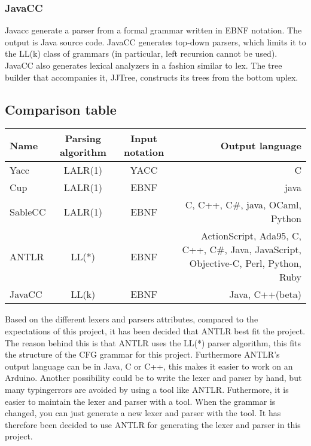 \subsubsection{JavaCC}
Javacc generate a parser from a formal grammar written in EBNF notation. The output is Java source code. JavaCC generates top-down parsers, which limits it to the LL(k) class of grammars (in particular, left recursion cannot be used). JavaCC also generates lexical analyzers in a fashion similar to lex\citep{Javacc}. The tree builder that accompanies it, JJTree, constructs its trees from the bottom uplex\citep{JJTree}.


\subsection{Comparison table}
\begin{table}[H]
\begin{tabularx}{\textwidth}{|l|c|c|R|}
\hline
\textbf{Name} & \textbf{Parsing algorithm} & \textbf{Input notation} & \textbf{Output language}\\ \hline
Yacc & LALR(1) & YACC & C\\ \hline
Cup & LALR(1) & EBNF & java\\ \hline
SableCC & LALR(1) & EBNF & C, C++, C\#, java, OCaml, Python\\ \hline
ANTLR & LL(*) & EBNF & ActionScript, Ada95, C, C++, C\#, Java, JavaScript, Objective-C, Perl, Python, Ruby\\ \hline
JavaCC & LL(k) & EBNF & Java, C++(beta)\\ \hline
\end{tabularx}
\end{table}

Based on the different lexers and parsers attributes, compared to the expectations of this project, it has been decided that ANTLR best fit the project. The reason behind this is that ANTLR uses the LL(*) parser algorithm, this fits the structure of the CFG grammar for this project. Furthermore ANTLR's output language can be in Java, C or C++, this makes it easier to work on an Arduino. Another possibility could be to write the lexer and parser by hand, but many typingerrors are avoided by using a tool like ANTLR. Futhermore, it is easier to maintain the lexer and parser with a tool. When the grammar is changed, you can just generate a new lexer and parser with the tool. It has therefore been decided to use ANTLR for generating the lexer and parser in this project.